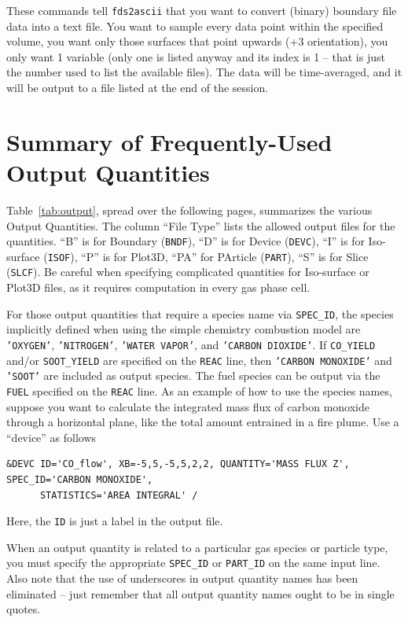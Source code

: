 \documentclass[11pt]{book}
\newcommand{\ct}{\tt\small}
\begin{document}
\normalsize \noindent
These commands tell {\ct fds2ascii} that you want to convert (binary)
boundary file data into a text file. You want to sample
every data point within the specified volume, you want only those surfaces that point
upwards (+3 orientation), you only want 1 variable (only one is listed anyway and its index is
1 -- that is just the number used to list the available files). The data will be time-averaged, and it will
be output to a file listed at the end of the session.



\clearpage
\section{Summary of Frequently-Used Output Quantities}
\label{info:outputquantities}

Table~\ref{tab:output}, spread over the following pages, summarizes the various Output Quantities.
The column ``File Type'' lists the allowed output files for the quantities. ``B'' is for Boundary ({\ct BNDF}),
``D'' is for Device ({\ct DEVC}), ``I'' is for Iso-surface ({\ct ISOF}), ``P'' is for Plot3D, ``PA'' for PArticle ({\ct PART}),
``S'' is for Slice ({\ct SLCF}). Be careful
when specifying complicated quantities for Iso-surface or Plot3D files, as it requires computation in every gas phase cell.

For those output quantities that require a species name via {\ct SPEC\_ID}, the species implicitly defined when using the simple chemistry
combustion model are {\ct 'OXYGEN'}, {\ct 'NITROGEN'}, {\ct 'WATER VAPOR'}, and {\ct 'CARBON DIOXIDE'}. If {\ct CO\_YIELD} and/or {\ct SOOT\_YIELD} are
specified on the {\ct REAC} line, then {\ct 'CARBON MONOXIDE'} and {\ct 'SOOT'} are included as output species. The fuel species can be output via
the {\ct FUEL} specified on the {\ct REAC} line. As an example of how to use the species names, suppose you want to calculate the integrated mass flux of carbon monoxide
through a horizontal plane, like the total amount entrained in a fire plume. Use a ``device'' as follows

\footnotesize
\begin{verbatim}
&DEVC ID='CO_flow', XB=-5,5,-5,5,2,2, QUANTITY='MASS FLUX Z', SPEC_ID='CARBON MONOXIDE',
      STATISTICS='AREA INTEGRAL' /
\end{verbatim}
\normalsize

\noindent
Here, the {\ct ID} is just a label in the output file.


\begin{warning}
When an output
quantity is related to a particular gas species or particle type, you must specify the appropriate {\ct SPEC\_ID} or
{\ct PART\_ID} on the same input line. Also note that the use of underscores in output quantity names has been eliminated -- just
remember that all output quantity names ought to be in single quotes.
\end{warning}
\end{document}
